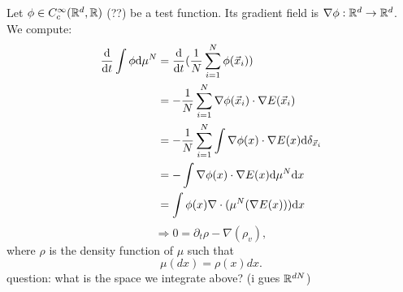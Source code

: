 Let $\phi \in C_c^{\infty}(\mathbb{R}^{d}, \mathbb{R})$ (??) be a test function. 
Its gradient field is $ \nabla \phi : \mathbb{R}^d \rightarrow \mathbb{R}^d$. 
We compute: 
\begin{align*}
    \frac{\mathrm{d}}{\mathrm{d} t} \int \phi \mathrm{d} \mu^N 
    &= \frac{\mathrm{d}}{\mathrm{d} t} (\frac{1}{N} \sum\limits_{i=1}^{N} \phi(\vec{x}_i)) \\
    &= - \frac{1}{N} \sum\limits_{i=1}^{N} \nabla \phi(\vec{x}_i) \cdot \nabla E(\vec{x}_i) \\
    &= - \frac{1}{N} \sum\limits_{i=1}^{N} \int \nabla \phi(x) \cdot \nabla E(x) \mathrm{d} \delta_{\vec{x}_i} \\
    &= - \int \nabla \phi(x) \cdot \nabla E(x) \mathrm{d} \mu^N \mathrm{d} x \\
    &= \int \phi(x)  \nabla \cdot ( \mu^N(\nabla E(x))) \mathrm{d} x \\
\end{align*}
\[ \Rightarrow  0 = \partial_t \rho - \nabla(\rho_v),\]
where $\rho$ is the density function of $\mu$ such that \[ \mu(dx) = \rho(x) dx. \]
question: what is the space we integrate above? (i gues $\mathbb{R}^{dN}$)